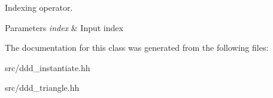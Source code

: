 Indexing operator. 


\begin{DoxyParams}{Parameters}
{\em index} & Input index \\
\hline
\end{DoxyParams}


The documentation for this class was generated from the following files\+:\begin{DoxyCompactItemize}
\item 
src/ddd\+\_\+instantiate.\+hh\item 
src/ddd\+\_\+triangle.\+hh\end{DoxyCompactItemize}

